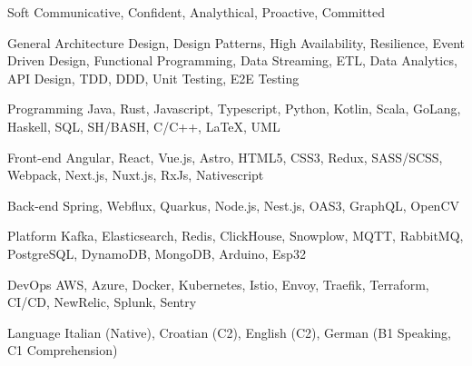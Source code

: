 
\begin{cvskills}

  \cvskill
    {Soft} %
    {Communicative, Confident, Analythical, Proactive, Committed} %

  \cvskill
    {General} %
    {Architecture Design, Design Patterns, High Availability, Resilience, Event Driven Design, Functional Programming,\newline
    Data Streaming, ETL, Data Analytics, API Design, TDD, DDD, Unit Testing, E2E Testing} %

  \cvskill
    {Programming} %
    {Java, Rust, Javascript, Typescript, Python, Kotlin, Scala, GoLang, Haskell, SQL, SH/BASH, C/C++, LaTeX, UML} %

  \cvskill
    {Front-end} %
    {Angular, React, Vue.js, Astro, HTML5, CSS3, Redux, SASS/SCSS, Webpack, Next.js, Nuxt.js, RxJs, Nativescript} %
    
  \cvskill
    {Back-end} %
    {Spring, Webflux, Quarkus, Node.js, Nest.js, OAS3, GraphQL, OpenCV} %

  \cvskill
    {Platform} %
    {Kafka, Elasticsearch, Redis, ClickHouse, Snowplow, MQTT, RabbitMQ, PostgreSQL, DynamoDB, MongoDB, Arduino, Esp32} %

  \cvskill
    {DevOps} %
    {AWS, Azure, Docker, Kubernetes, Istio, Envoy, Traefik, Terraform, CI/CD, NewRelic, Splunk, Sentry} %

  \cvskill
    {Language} %
    {Italian (Native), Croatian (C2), English (C2), German (B1 Speaking, C1 Comprehension)} %

\end{cvskills}
